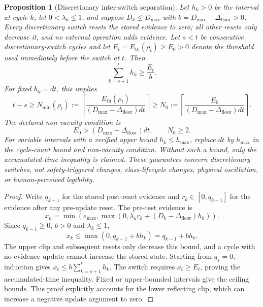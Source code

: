 \documentclass[11pt]{article}
\newtheorem{proposition}{Proposition}
\newcommand{\Dfloor}{\Delta_{\text{floor}}}
\newcommand{\Eth}{E_{\text{th}}}
\begin{document}
\begin{proposition}[Discretionary inter-switch separation] \label{prop:p2}
Let $h_k>0$ be the interval at cycle $k$, let $0<\lambda_k\le1$, and suppose $D_k\le D_{\max}$ with $b=D_{\max}-\Dfloor>0$. Every discretionary switch resets the stored evidence to zero; all other resets only decrease it, and no external operation adds evidence. Let $s<t$ be consecutive discretionary-switch cycles and let $E_t=\Eth(\rho_t)\ge E_0>0$ denote the threshold used immediately before the switch at $t$. Then
\begin{equation}
\sum_{k=s+1}^{t} h_k \ge \frac{E_t}{b}.
\label{eq:p2variable}
\end{equation}
For fixed $h_k=dt$, this implies
\begin{equation}
t-s\ge N_{\min}(\rho_t):=\left\lceil\frac{\Eth(\rho_t)}{(D_{\max}-\Dfloor)dt}\right\rceil
\ge N_0:=\left\lceil\frac{E_0}{(D_{\max}-\Dfloor)dt}\right\rceil.
\label{eq:nmin}
\end{equation}
The declared non-vacuity condition is
\begin{equation}
E_0>(D_{\max}-\Dfloor)dt,\qquad N_0\ge2.
\label{eq:p2nonvac}
\end{equation}
For variable intervals with a verified upper bound $h_k\le h_{\max}$, replace $dt$ by $h_{\max}$ in the cycle-count bound and non-vacuity condition. Without such a bound, only the accumulated-time inequality is claimed. These guarantees concern discretionary switches, not safety-triggered changes, class-lifecycle changes, physical oscillation, or human-perceived legibility.
\end{proposition}

\begin{proof}
Write $q_{k-1}$ for the stored post-reset evidence and $r_k\in[0,q_{k-1}]$ for the evidence after any pre-update reset. The pre-test evidence is
\[
x_k=\min(e_{\max},\max(0,\lambda_k r_k+(D_k-\Dfloor)h_k)).
\]
Since $q_{k-1}\ge0$, $b>0$ and $\lambda_k\le1$,
\[
x_k\le\max(0,q_{k-1}+bh_k)=q_{k-1}+bh_k.
\]
The upper clip and subsequent resets only decrease this bound, and a cycle with no evidence update cannot increase the stored state. Starting from $q_s=0$, induction gives $x_t\le b\sum_{k=s+1}^t h_k$. The switch requires $x_t\ge E_t$, proving the accumulated-time inequality. Fixed or upper-bounded intervals give the ceiling bounds. This proof explicitly accounts for the lower reflecting clip, which can increase a negative update argument to zero.
\end{proof}
\end{document}
